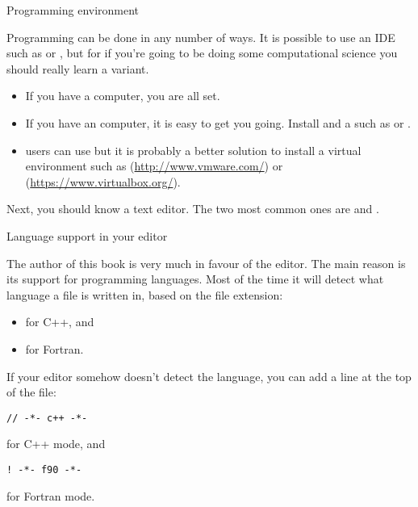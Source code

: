 
 {Programming environment}

Programming can be done in any number of ways. It is possible to use an
\ac{IDE} such as  or , but
for if you're going to be doing some computational science
you should really learn a  variant.
\begin{itemize}
\item If you have a  computer, you are all set.
\item If you have an  computer, it is easy to get you
  going. Install  and a  such as  or .
\item {} users can use
   but it is probably a better solution to install a
  virtual environment such as 
  (\url{http://www.vmware.com/}) or
   (\url{https://www.virtualbox.org/}).
\end{itemize}

Next, you should know a text editor. The two most common ones are
 and .

 {Language support in your editor}
\label{sec:editor-mode}

The author of this book is very much in favour of the
 editor. The main reason is its support for
programming languages. Most of the time it will detect what language a
file is written in, based on the file extension:
\begin{itemize}
\item {} for C++, and
\item {} for Fortran.
\end{itemize}
If your editor somehow doesn't detect the language, you can add a line
at the top of the file:
\begin{verbatim}
// -*- c++ -*-
\end{verbatim}
for C++ mode, and 
\begin{verbatim}
! -*- f90 -*-
\end{verbatim}
for Fortran mode.

